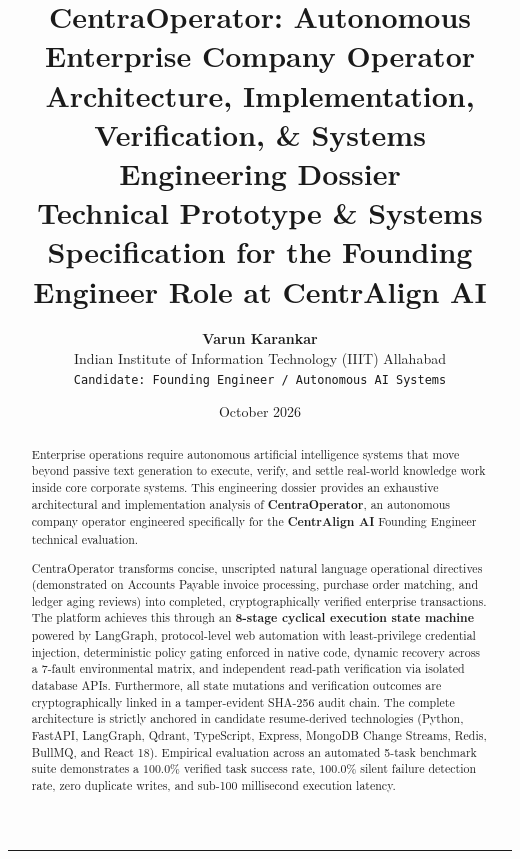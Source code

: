 \documentclass[11pt,a4paper]{article}
\title{
  \vspace{-1.5cm}
  {\Huge\textbf{\color{centrablue}CentraOperator: Autonomous Enterprise Company Operator}}\\[8pt]
  {\Large\textsf{\color{centrateal}Architecture, Implementation, Verification, \& Systems Engineering Dossier}}\\[14pt]
  {\normalsize\textsf{\color{centragray}Technical Prototype \& Systems Specification for the Founding Engineer Role at CentrAlign AI}}
}
\author{
  \textbf{Varun Karankar}\\
  \textsf{Indian Institute of Information Technology (IIIT) Allahabad}\\
  \texttt{Candidate: Founding Engineer / Autonomous AI Systems}
}
\date{October 2026}
\begin{document}
\maketitle

\begin{abstract}
\noindent
Enterprise operations require autonomous artificial intelligence systems that move beyond passive text generation to execute, verify, and settle real-world knowledge work inside core corporate systems. This engineering dossier provides an exhaustive architectural and implementation analysis of \textbf{CentraOperator}, an autonomous company operator engineered specifically for the \textbf{CentrAlign AI} Founding Engineer technical evaluation.

CentraOperator transforms concise, unscripted natural language operational directives (demonstrated on Accounts Payable invoice processing, purchase order matching, and ledger aging reviews) into completed, cryptographically verified enterprise transactions. The platform achieves this through an \textbf{8-stage cyclical execution state machine} powered by LangGraph, protocol-level web automation with least-privilege credential injection, deterministic policy gating enforced in native code, dynamic recovery across a 7-fault environmental matrix, and independent read-path verification via isolated database APIs. Furthermore, all state mutations and verification outcomes are cryptographically linked in a tamper-evident SHA-256 audit chain. The complete architecture is strictly anchored in candidate resume-derived technologies (Python, FastAPI, LangGraph, Qdrant, TypeScript, Express, MongoDB Change Streams, Redis, BullMQ, and React 18). Empirical evaluation across an automated 5-task benchmark suite demonstrates a $100.0\%$ verified task success rate, $100.0\%$ silent failure detection rate, zero duplicate writes, and sub-100 millisecond execution latency.
\end{abstract}

\vspace{0.4cm}
{
  \hypersetup{linkcolor=centrablue}
  \tableofcontents
}
\vspace{0.6cm}
\hrule
\vspace{0.8cm}


\newpage

\newpage

\newpage

\newpage

\newpage

\newpage

\newpage

\newpage

\newpage

\newpage

\end{document}
